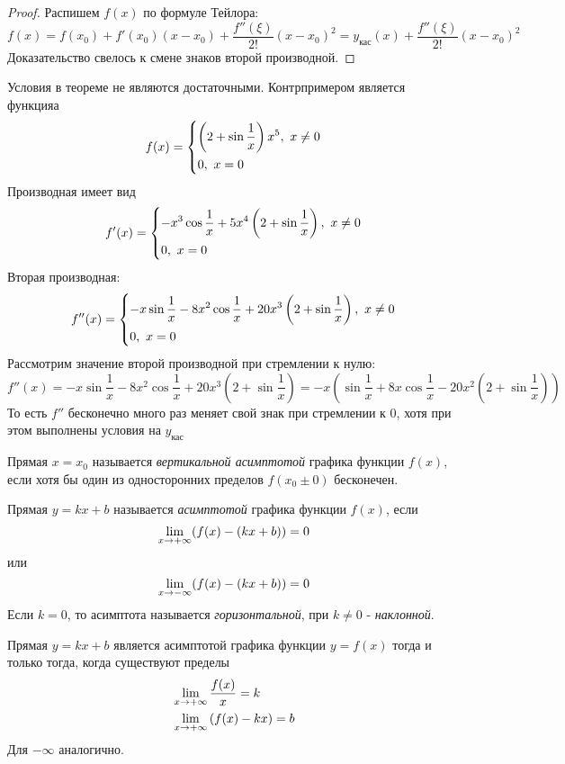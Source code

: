 \begin{proof}
	Распишем $f(x)$ по формуле Тейлора:
	\[
		f(x) = f(x_0) + f'(x_0)(x - x_0) + \frac{f''(\xi)}{2!}(x - x_0)^2 = y_{\text{кас}}(x) + \frac{f''(\xi)}{2!}(x - x_0)^2
	\]
	Доказательство свелось к смене знаков второй производной.
\end{proof}

\begin{note}
	Условия в теореме не являются достаточными. Контрпримером является функцияа
	\[
		f(x) = \left\{\begin{aligned}
			&{\left(2 + \sin \frac{1}{x}\right)x^5,\ x \neq 0}
			\\
			&{0,\ x = 0}
		\end{aligned}\right.
	\]
	Производная имеет вид
	\[
		f'(x) = \left\{\begin{aligned}
			&{-x^3\cos \frac{1}{x} + 5x^4\left(2 + \sin \frac{1}{x}\right),\ x \neq 0}
			\\
			&{0,\ x = 0}
		\end{aligned}\right.
	\]
	Вторая производная:
	\[
		f''(x) = \left\{\begin{aligned}
			&{-x\sin \frac{1}{x} - 8x^2 \cos \frac{1}{x} + 20x^3 \left(2 + \sin \frac{1}{x}\right),\ x \neq 0}
			\\
			&{0,\ x = 0}
		\end{aligned}\right.
	\]
	Рассмотрим значение второй производной при стремлении к нулю:
	\[
		f''(x) = -x\sin \frac{1}{x} - 8x^2 \cos \frac{1}{x} + 20x^3 \left(2 + \sin \frac{1}{x}\right) = -x \left(\sin \frac{1}{x} + 8x \cos \frac{1}{x} - 20x^2 \left(2 + \sin \frac{1}{x}\right)\right)
	\]
	То есть $f''$ бесконечно много раз меняет свой знак при стремлении к 0, хотя при этом выполнены условия на $y_{\text{кас}}$
\end{note}


\begin{definition}
	Прямая $x = x_0$ называется \textit{вертикальной асимптотой} графика функции $f(x)$, если хотя бы один из односторонних пределов $f(x_0 \pm 0)$ бесконечен.
\end{definition}

\begin{definition}
	Прямая $y = kx + b$ называется \textit{асимптотой} графика функции $f(x)$, если
	\[
		\lim\limits_{x \to +\infty} (f(x) - (kx + b)) = 0
	\]
	или
	\[
		\lim\limits_{x \to -\infty} (f(x) - (kx + b)) = 0
	\]
	Если $k = 0$, то асимптота называется \textit{горизонтальной}, при $k \neq 0$ - \textit{наклонной}.
\end{definition}

\begin{theorem}
	Прямая $y = kx + b$ является асимптотой графика функции $y = f(x)$ тогда и только тогда, когда существуют пределы
	\begin{align*}
		&\lim\limits_{x \to +\infty} \frac{f(x)}{x} = k
		\\
		&\lim\limits_{x \to +\infty} \left(f(x) - kx\right) = b
	\end{align*}
	Для $-\infty$ аналогично.
\end{theorem}

